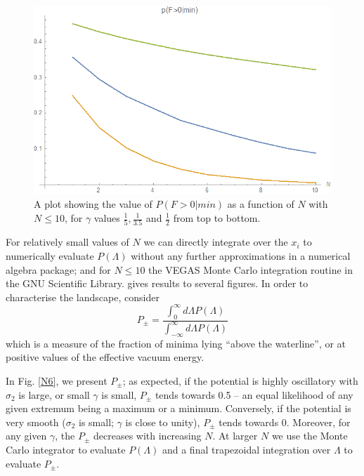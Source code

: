\documentclass[12pt]{article}
\begin{document}
\begin{figure}
  \centering
    \includegraphics[width=\linewidth]{PVaryingWithN.png}
  \caption{A plot showing the value of $P(F>0|min)$ as a function of $N$ with $N\le10$, for $\gamma$ values $\frac{1}{5}, \frac{1}{3.5}$ and $\frac{1}{2}$ from top to bottom.}
  \label{gamma}
\end{figure}


For relatively small values of $N$ we can directly integrate over the $x_i$ to numerically evaluate $P(\Lambda)$ without any further approximations in a numerical algebra package; and for $N\le10$ the VEGAS \cite{VEGAS} Monte Carlo integration routine in the GNU Scientific Library.\cite{GSL} gives results to several figures.   In order to characterise the landscape, consider 
%
\begin{equation} \label{Ppm}
P_\pm = \frac{\int_0^\infty d \Lambda P(\Lambda)} {\int_{-\infty}^\infty d \Lambda P(\Lambda)} 
\end{equation}
%
which is a measure of the fraction of minima lying ``above the waterline'', or at positive values of the effective vacuum energy. 

 In Fig. \ref{N6}, we present $P_\pm$; as expected, if the potential is highly oscillatory with $\sigma_2$ is large, or small $\gamma$ is small, $P_\pm$  tends towards 0.5 --  an equal likelihood of any given extremum being a maximum or a minimum. Conversely, if the potential is very smooth ($\sigma_2$ is small; $\gamma$ is close to unity), $P_\pm$  tends towards 0. Moreover, for any given $\gamma$, the $P_\pm$ decreases with increasing $N$.   At larger $N$ we use the Monte Carlo integrator to evaluate $P(\Lambda)$ and a final trapezoidal integration over $\Lambda$  to evaluate $P_\pm$. 
 
\end{document}
